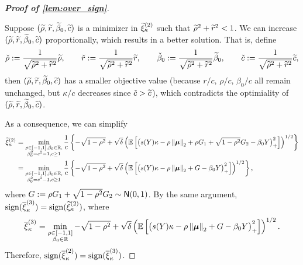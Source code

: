 \begin{proof}[\textbf{Proof of \cref{lem:over_sign}}]
\begin{itemize}
    Suppose $(\widetilde\rho, \widetilde r, \widetilde\beta_0, \widetilde c)$ is a minimizer in $\widetilde\xi_{\kappa}^{(2)}$ such that $\widetilde\rho^2 + \widetilde r^2 < 1$. We can increase $(\widetilde\rho, \widetilde r, \widetilde\beta_0, \widetilde c)$ proportionally, which results in a better solution. That is, define
    \begin{equation*}
        \check\rho := \frac{1}{\sqrt{\widetilde\rho^2 + \widetilde r^2}} \widetilde\rho, \qquad
        \check r := \frac{1}{\sqrt{\widetilde\rho^2 + \widetilde r^2}} \widetilde r,  \qquad
        \check\beta_0 := \frac{1}{\sqrt{\widetilde\rho^2 + \widetilde r^2}} \widetilde\beta_0,  \qquad
        \check c := \frac{1}{\sqrt{\widetilde\rho^2 + \widetilde r^2}} \widetilde c,
    \end{equation*}
    then $(\widetilde\rho, \widetilde r, \widetilde\beta_0, \widetilde c)$ has a smaller objective value (because $r/c$, $\rho/c$, $\beta_0/c$ all remain unchanged, but $\kappa/c$ decreases since $\check{c} > \widetilde c$), which contradicts the optimiality of $(\widetilde\rho, \widetilde r, \widetilde\beta_0, \widetilde c)$.
\end{itemize}
As a consequence, we can simplify
\begin{align*}
        \widetilde\xi_{\kappa}^{(2)} & =  \min_{ \substack{ \rho \in [-1, 1], \beta_0 \in  \mathbb{R}, \\
        \beta_0^2 = c^2 - 1, c \ge 1
    } }
        \frac1c \left\{  -\sqrt{1 - \rho^2} + \sqrt{\delta} \left( \mathbb{E}\left[ \bigl(  s(Y) \kappa - \rho \left\|{\text{\boldmath $\mu$}}\right\|_2 + \rho G_1 + \sqrt{1 - \rho^2} G_2 - \beta_0 Y \bigr)_+^2 \right] \right)^{1/2} 
        \right\} \\
        & = \min_{ \substack{ \rho \in [-1, 1], \beta_0 \in  \mathbb{R}, \\
        \beta_0^2 = c^2 - 1, c \ge 1
    } }
        \frac1c \left\{  -\sqrt{1 - \rho^2} + \sqrt{\delta} \left( \mathbb{E}\left[ \bigl(  s(Y) \kappa - \rho \left\|{\text{\boldmath $\mu$}}\right\|_2 + G - \beta_0 Y \bigr)_+^2 \right] \right)^{1/2} 
        \right\},
\end{align*}
where $G := \rho G_1 + \sqrt{1 - \rho^2} G_2 \sim {\sf N}(0, 1)$. By the same argument, $\mathrm{sign}(\overline\xi_{\kappa}^{(3)}) = \mathrm{sign}(\widetilde\xi_{\kappa}^{(2)})$, where
\begin{equation*}
        \overline\xi_{\kappa}^{(3)}  =  \min_{ \substack{ \rho \in [-1, 1] \\  \beta_0 \in  \mathbb{R} } }
        -\sqrt{1 - \rho^2} + \sqrt{\delta} \left( \mathbb{E}\left[ \bigl(  s(Y) \kappa - \rho \left\|{\text{\boldmath $\mu$}}\right\|_2 + G - \beta_0 Y \bigr)_+^2 \right] \right)^{1/2}.
\end{equation*}
Therefore, $\mathrm{sign}(\overline\xi_{\kappa}^{(2)}) = \mathrm{sign}(\overline\xi_{\kappa}^{(3)})$.


\end{proof}
